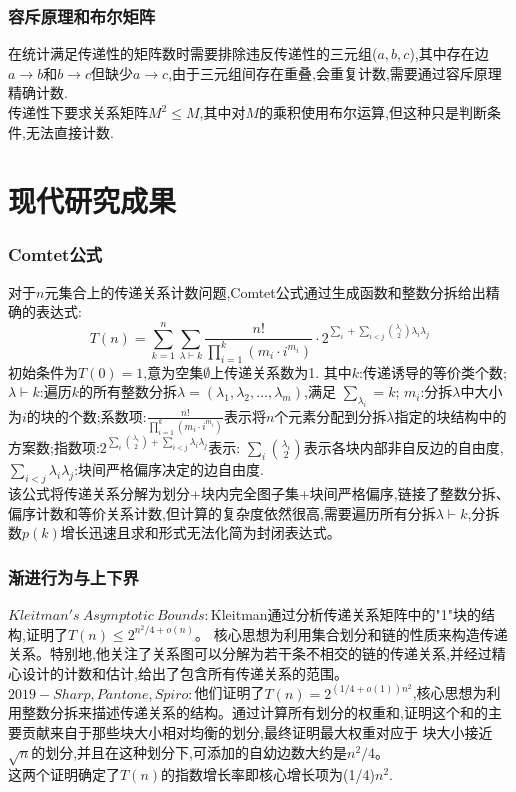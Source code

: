 \documentclass[12pt]{article}
\theoremstyle{definition}
\begin{document}
\subsubsection{容斥原理和布尔矩阵}
在统计满足传递性的矩阵数时需要排除违反传递性的三元组($a,b,c$),其中存在边$a\rightarrow b$和$b \rightarrow c$但缺少$a \rightarrow c$,由于三元组间存在重叠,会重复计数,需要通过容斥原理精确计数.\\
\hspace*{2em}传递性下要求关系矩阵$M^2$$\leq$$M$,其中对$M$的乘积使用布尔运算,但这种只是判断条件,无法直接计数.
\section{现代研究成果}
\subsubsection{Comtet公式}
对于$n$元集合上的传递关系计数问题,Comtet公式通过生成函数和整数分拆给出精确的表达式:
\[
 T(n)=\sum_{k=1}^{n}\sum_{\lambda \vdash k}^{}\frac{n!}{ {\textstyle \prod_{i=1}^{k}}(m_{i}\cdot i^{m_{i}}) }\cdot 2^{ {\textstyle \sum_{i}^{}} + {\textstyle \sum_{i<j}^{} \binom{\lambda_{i}}{2}\lambda_{i}\lambda_{j}} }
\]
初始条件为$T(0)=1$,意为空集$\emptyset$上传递关系数为1.
其中$k$:传递诱导的等价类个数;$\lambda \vdash k$:遍历$k$的所有整数分拆$\lambda = (\lambda_{1},\lambda_{2},\dots ,\lambda_{m})$,满足 ${\textstyle \sum_{\lambda_{i}}^{}}=k$;
$m_i$:分拆$\lambda$中大小为$i$的块的个数;系数项:$\frac{n!}{{\textstyle \prod_{i=1}^{k}}(m_{i}\cdot i^{m_{i}})}$表示将$n$个元素分配到分拆$\lambda$指定的块结构中的方案数;指数项:$2^{\textstyle \sum_{i}^{}\binom{\lambda_{i}}{2}+\textstyle \sum_{i<j}^{}\lambda_{i}\lambda_{j} }$表示:
$\textstyle \sum_{i}^{}\binom{\lambda_{i}}{2}$表示各块内部非自反边的自由度,$\textstyle \sum_{i<j}^{}\lambda_{i}\lambda_{j}$:块间严格偏序决定的边自由度.
\\
\hspace*{2em}该公式将传递关系分解为划分+块内完全图子集+块间严格偏序,链接了整数分拆、偏序计数和等价关系计数,但计算的复杂度依然很高,需要遍历所有分拆$\lambda \vdash k$,分拆数$p(k)$增长迅速且求和形式无法化简为封闭表达式。
\subsubsection{渐进行为与上下界}
$Kleitman's\ Asymptotic\ Bounds:$Kleitman通过分析传递关系矩阵中的"1"块的结构,证明了$T(n)\leq 2^{n^2/4+o(n)}$。
核心思想为利用集合划分和链的性质来构造传递关系。特别地,他关注了关系图可以分解为若干条不相交的链的传递关系,并经过精心设计的计数和估计,给出了包含所有传递关系的范围。\\
\hspace*{2em}$2019-Sharp,Pantone,Spiro:$他们证明了$T(n)=2^{(1/4+o(1))n^2}$,核心思想为利用整数分拆来描述传递关系的结构。通过计算所有划分的权重和,证明这个和的主要贡献来自于那些块大小相对均衡的划分,最终证明最大权重对应于
块大小接近$\sqrt{n}$的划分,并且在这种划分下,可添加的自幼边数大约是$n^{2}/4$。\\
\hspace*{2em}这两个证明确定了$T(n)$的指数增长率即核心增长项为(1/4)$n^2$.
\end{document}
